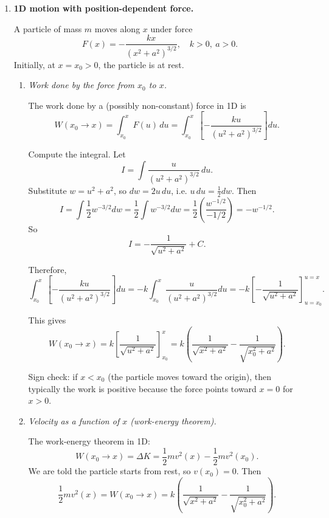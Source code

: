 \documentclass[../main.tex]{subfiles}
\begin{document}
\begin{enumerate}
If the package is thrown at speed $|\vec{v}_p|$ and angle $\theta$ above the horizontal, then
\[
v_{px} = |\vec{v}_p| \cos\theta,
\qquad
v_{py} = |\vec{v}_p| \sin\theta.
\]

Physically: the boat recoils so that the center of mass of (boat+child+package) keeps the same velocity that it had just before the throw.


\item \textbf{1D motion with position-dependent force.}

A particle of mass $m$ moves along $x$ under force
\[
F(x) = - \frac{k x}{(x^2 + a^2)^{3/2}},
\quad k>0,\ a>0.
\]
Initially, at $x=x_0>0$, the particle is at rest.

\begin{enumerate}
    \item \textit{Work done by the force from $x_0$ to $x$.}

    The work done by a (possibly non-constant) force in 1D is
    \[
    W(x_0 \to x) = \int_{x_0}^{x} F(u)\,du
    = \int_{x_0}^{x} 
    \left[- \frac{k u}{(u^2 + a^2)^{3/2}} \right] du.
    \]

    Compute the integral. Let
    \[
    I = \int \frac{u}{(u^2 + a^2)^{3/2}} \, du.
    \]
    Substitute $w = u^2 + a^2$, so $dw = 2u\,du$, i.e. $u\,du = \frac{1}{2}dw$. Then
    \[
    I = \int \frac{1}{2} w^{-3/2} dw
    = \frac{1}{2} \int w^{-3/2} dw
    = \frac{1}{2} \left( \frac{w^{-1/2}}{-1/2} \right)
    = - w^{-1/2}.
    \]
    So
    \[
    I = - \frac{1}{\sqrt{u^2 + a^2}} + C.
    \]

    Therefore,
    \[
    \int_{x_0}^{x} 
    \left[- \frac{k u}{(u^2 + a^2)^{3/2}} \right] du
    = -k \int_{x_0}^{x} \frac{u}{(u^2 + a^2)^{3/2}} du
    = -k \left[ - \frac{1}{\sqrt{u^2 + a^2}} \right]_{u=x_0}^{u=x}.
    \]

    This gives
    \[
    W(x_0 \to x)
    = k \left[ \frac{1}{\sqrt{u^2 + a^2}} \right]_{x_0}^{x}
    = k \left( \frac{1}{\sqrt{x^2 + a^2}} - \frac{1}{\sqrt{x_0^2 + a^2}} \right).
    \]

    Sign check: if $x < x_0$ (the particle moves toward the origin), then typically the work is positive because the force points toward $x=0$ for $x>0$.

    \item \textit{Velocity as a function of $x$ (work-energy theorem).}

    The work-energy theorem in 1D:
    \[
    W(x_0 \to x) = \Delta K = \frac{1}{2} m v^2(x) - \frac{1}{2} m v^2(x_0).
    \]
    We are told the particle starts from rest, so $v(x_0)=0$. Then
    \[
    \frac{1}{2} m v^2(x)
    = W(x_0 \to x)
    = k \left( \frac{1}{\sqrt{x^2 + a^2}} - \frac{1}{\sqrt{x_0^2 + a^2}} \right).
    \]


\end{enumerate}
\end{enumerate}
\end{document}
